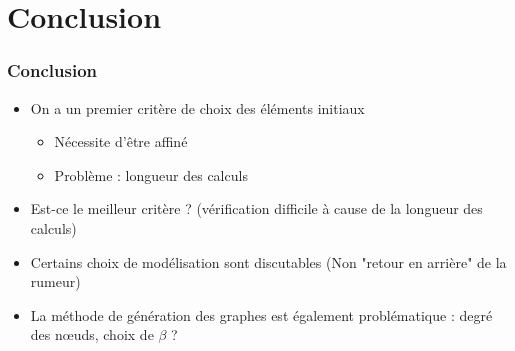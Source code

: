 \documentclass{beamer}
\begin{document}
\section{Conclusion}
\begin{frame}
  \frametitle{Conclusion}
  \begin{itemize}
    \item<1->On a un premier critère de choix des éléments initiaux 
    \begin{itemize}
      \item<2->Nécessite d'être affiné
      \item<3->Problème : longueur des calculs
    \end{itemize}
    \item<4->Est-ce le meilleur critère ? (vérification difficile à cause de la longueur des calculs)
    \item<5->Certains choix de modélisation sont discutables (Non "retour en arrière" de la rumeur)
    \item<6->La méthode de génération des graphes est également problématique : degré des nœuds, choix de $\beta$ ?
  \end{itemize}
\end{frame}
\end{document}
